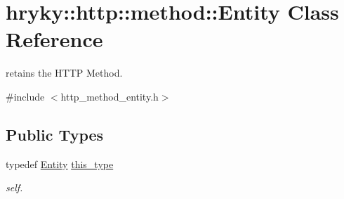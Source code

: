 \hypertarget{classhryky_1_1http_1_1method_1_1_entity}{\section{hryky\-:\-:http\-:\-:method\-:\-:Entity Class Reference}
\label{classhryky_1_1http_1_1method_1_1_entity}
}


retains the H\-T\-T\-P Method.  




{\ttfamily \#include $<$http\-\_\-method\-\_\-entity.\-h$>$}

\subsection*{Public Types}
\begin{DoxyCompactItemize}
\item 
\hypertarget{classhryky_1_1http_1_1method_1_1_entity_a3953ff7f851afb4c64fde9ab521deb88}{typedef \hyperlink{classhryky_1_1http_1_1method_1_1_entity}{Entity} \hyperlink{classhryky_1_1http_1_1method_1_1_entity_a3953ff7f851afb4c64fde9ab521deb88}{this\-\_\-type}}\label{classhryky_1_1http_1_1method_1_1_entity_a3953ff7f851afb4c64fde9ab521deb88}

\begin{DoxyCompactList}\small\item\em self. \end{DoxyCompactList}\end{DoxyCompactItemize}
